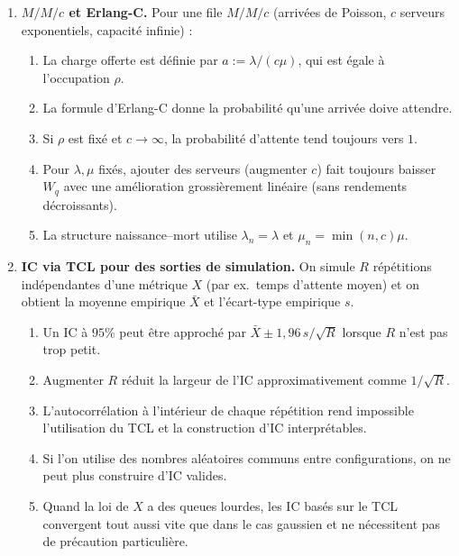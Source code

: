 \documentclass[a4paper,11pt]{article}
\begin{document}
\begin{enumerate}
\item \textbf{$M/M/c$ et Erlang-C.} Pour une file $M/M/c$ (arrivées de Poisson, $c$ serveurs exponentiels, capacité infinie) :
  \begin{enumerate}
    \item La charge offerte est définie par $a := \lambda/(c\mu)$, qui est égale à l'occupation $\rho$.
    \item La formule d'Erlang-C donne la probabilité qu'une arrivée doive attendre.
    \item Si $\rho$ est fixé et $c \to \infty$, la probabilité d'attente tend toujours vers $1$.
    \item Pour $\lambda,\mu$ fixés, ajouter des serveurs (augmenter $c$) fait toujours baisser $W_q$ avec une amélioration grossièrement linéaire (sans rendements décroissants).
    \item La structure naissance--mort utilise $\lambda_n=\lambda$ et $\mu_n = \min(n,c)\mu$.
  \end{enumerate}

\item \textbf{IC via TCL pour des sorties de simulation.} On simule $R$ répétitions indépendantes d'une métrique $X$ (par ex.\ temps d'attente moyen) et on obtient la moyenne empirique $\bar X$ et l'écart-type empirique $s$.
  \begin{enumerate}
    \item Un IC à $95\%$ peut être approché par $\bar X \pm 1{,}96\,s/\sqrt{R}$ lorsque $R$ n'est pas trop petit.
    \item Augmenter $R$ réduit la largeur de l'IC approximativement comme $1/\sqrt{R}$.
    \item L'autocorrélation à l'intérieur de chaque répétition rend impossible l'utilisation du TCL et la construction d'IC interprétables.
    \item Si l'on utilise des nombres aléatoires communs entre configurations, on ne peut plus construire d'IC valides.
    \item Quand la loi de $X$ a des queues lourdes, les IC basés sur le TCL convergent tout aussi vite que dans le cas gaussien et ne nécessitent pas de précaution particulière.
  \end{enumerate}


\end{enumerate}
\end{document}
